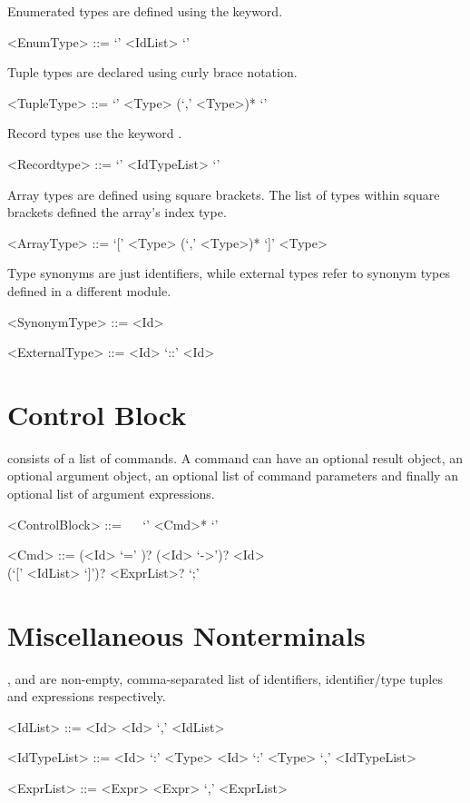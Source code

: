 Enumerated types are defined using the  keyword.
\begin{grammar}
    <EnumType> ::=  `{' <IdList> `}'
\end{grammar}

Tuple types are declared using curly brace notation.
\begin{grammar}
    <TupleType> ::= `{' <Type>  (`,' <Type>)* `}'
\end{grammar}

Record types use the keyword .
\begin{grammar}
    <Recordtype> ::=  `{' <IdTypeList> `}'
\end{grammar}

Array types are defined using square brackets. The list of types within square brackets defined the array's index type.
\begin{grammar}
    <ArrayType> ::= `[' <Type> (`,' <Type>)* `]' <Type>
\end{grammar}

Type synonyms are just identifiers, while external types refer to synonym types defined in a different module.
\begin{grammar}
    <SynonymType> ::= <Id>

    <ExternalType> ::= <Id> `::' <Id>
\end{grammar}

\section{Control Block}
 consists of a list of commands. A command can have an optional result object, an optional argument object, an optional list of command parameters and finally an optional list of argument expressions. 
\begin{grammar}
     <ControlBlock> ::= ~~ `{' <Cmd>* `}'

     <Cmd> ::= (<Id> `=' )? (<Id> `->')? <Id> \\
              (`[' <IdList> `]')? <ExprList>? `;'

\end{grammar}

\section{Miscellaneous Nonterminals} 

,  and  are non-empty, comma-separated list of identifiers, identifier/type tuples and expressions respectively.
\begin{grammar}
     <IdList> ::= <Id> \alt <Id> `,' <IdList>

     <IdTypeList> ::=  <Id> `:' <Type> 
                  \alt <Id> `:' <Type> `,' <IdTypeList>

     <ExprList> ::=  <Expr>
                \alt <Expr> `,' <ExprList>
\end{grammar}

